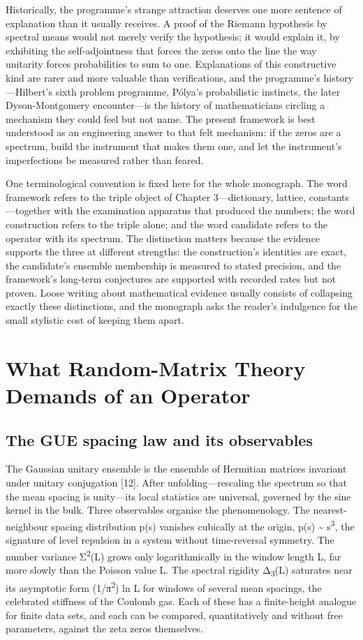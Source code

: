 \documentclass[10pt]{article}
\begin{document}
Historically, the programme's strange attraction deserves one more sentence of explanation than it usually receives. A proof of the Riemann hypothesis by spectral means would not merely verify the hypothesis; it would explain it, by exhibiting the self-adjointness that forces the zeros onto the line the way unitarity forces probabilities to sum to one. Explanations of this constructive kind are rarer and more valuable than verifications, and the programme's history---Hilbert's sixth problem programme, Pólya's probabilistic instincts, the later Dyson-Montgomery encounter---is the history of mathematicians circling a mechanism they could feel but not name. The present framework is best understood as an engineering answer to that felt mechanism: if the zeros are a spectrum, build the instrument that makes them one, and let the instrument's imperfections be measured rather than feared.

One terminological convention is fixed here for the whole monograph. The word framework refers to the triple object of Chapter 3---dictionary, lattice, constants---together with the examination apparatus that produced the numbers; the word construction refers to the triple alone; and the word candidate refers to the operator with its spectrum. The distinction matters because the evidence supports the three at different strengths: the construction's identities are exact, the candidate's ensemble membership is measured to stated precision, and the framework's long-term conjectures are supported with recorded rates but not proven. Loose writing about mathematical evidence usually consists of collapsing exactly these distinctions, and the monograph asks the reader's indulgence for the small stylistic cost of keeping them apart.

\section{What Random-Matrix Theory Demands of an Operator}\label{sec:ch2}
\subsection{The GUE spacing law and its observables}\label{sec:21}
The Gaussian unitary ensemble is the ensemble of Hermitian matrices invariant under unitary conjugation [12]. After unfolding---rescaling the spectrum so that the mean spacing is unity---its local statistics are universal, governed by the sine kernel in the bulk. Three observables organise the phenomenology. The nearest-neighbour spacing distribution p(s) vanishes cubically at the origin, p(s) \textasciitilde{} s\textsuperscript{3}, the signature of level repulsion in a system without time-reversal symmetry. The number variance Σ\textsuperscript{2}(L) grows only logarithmically in the window length L, far more slowly than the Poisson value L. The spectral rigidity Δ\textsubscript{3}(L) saturates near its asymptotic form (1/π\textsuperscript{2}) ln L for windows of several mean spacings, the celebrated stiffness of the Coulomb gas. Each of these has a finite-height analogue for finite data sets, and each can be compared, quantitatively and without free parameters, against the zeta zeros themselves.
\end{document}
